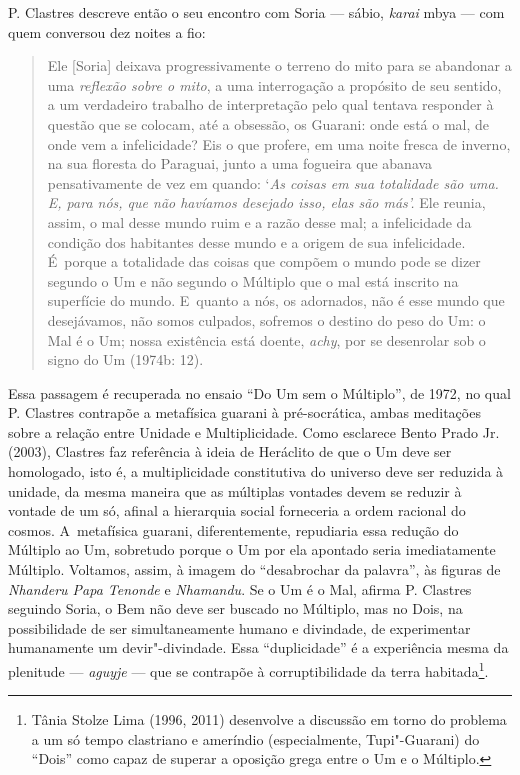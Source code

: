 P. Clastres descreve então o seu encontro com Soria --- sábio, \emph{karai} mbya
--- com quem conversou dez noites a fio:

\begin{quote}
Ele [Soria] deixava progressivamente o terreno do mito para se
abandonar a uma \emph{reflexão sobre o mito}, a uma interrogação a
propósito de seu sentido, a um verdadeiro trabalho de interpretação pelo
qual tentava responder à questão que se colocam, até a obsessão, os
Guarani: onde está o mal, de onde vem a infelicidade? Eis o que profere,
em uma noite fresca de inverno, na sua floresta do Paraguai, junto a uma
fogueira que abanava pensativamente de vez em quando: `\emph{As coisas
em sua totalidade são uma. E, para nós, que não havíamos desejado isso,
elas são más'.} Ele reunia, assim, o mal desse mundo ruim e a razão
desse mal; a infelicidade da condição dos habitantes desse mundo e a
origem de sua infelicidade. É~porque a totalidade das coisas que compõem
o mundo pode se dizer segundo o Um e não segundo o Múltiplo que o mal
está inscrito na superfície do mundo. E~quanto a nós, os adornados, não
é esse mundo que desejávamos, não somos culpados, sofremos o destino do
peso do Um: o Mal é o Um; nossa existência está doente, \emph{achy}, por se
desenrolar sob o signo do Um (1974b: 12).
\end{quote}

Essa passagem é recuperada no ensaio ``Do Um sem o Múltiplo'', de 1972, no
qual P. Clastres contrapõe a metafísica guarani à pré-socrática, ambas
meditações sobre a relação entre Unidade e Multiplicidade. Como
esclarece Bento Prado Jr. (2003), Clastres faz referência à ideia de
Heráclito de que o Um deve ser homologado, isto é, a multiplicidade
constitutiva do universo deve ser reduzida à unidade, da mesma maneira
que as múltiplas vontades devem se reduzir à vontade de um só, afinal a
hierarquia social forneceria a ordem racional do cosmos. A~metafísica
guarani, diferentemente, repudiaria essa redução do Múltiplo ao Um,
sobretudo porque o Um por ela apontado seria imediatamente Múltiplo.
Voltamos, assim, à imagem do ``desabrochar da palavra'', às figuras de
\emph{Nhanderu Papa Tenonde} e \emph{Nhamandu}. Se o Um é o Mal, afirma P. Clastres
seguindo Soria, o Bem não deve ser buscado no Múltiplo, mas no Dois, na
possibilidade de ser simultaneamente humano e divindade, de
experimentar humanamente um devir"-divindade. Essa ``duplicidade'' é a
experiência mesma da plenitude --- \emph{aguyje} --- que se contrapõe à
corruptibilidade da terra habitada\footnote{Tânia Stolze Lima (1996,
2011) desenvolve a discussão em torno do problema a um só tempo
clastriano e ameríndio (especialmente, Tupi"-Guarani) do ``Dois'' como
capaz de superar a oposição grega entre o Um e o Múltiplo.}.

